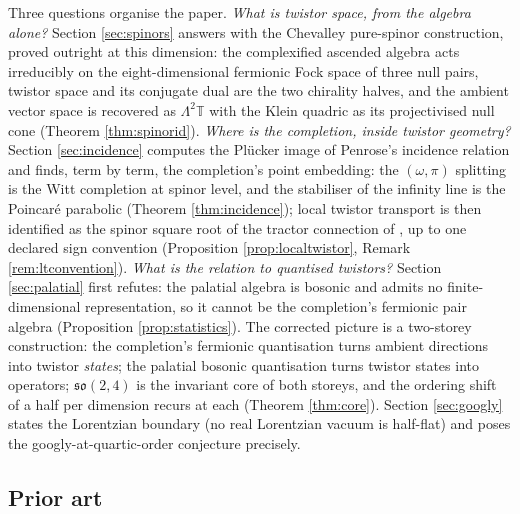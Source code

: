 \documentclass[11pt]{article}
\theoremstyle{definition}
\newcommand{\T}{\mathbb{T}}
\begin{document}
Three questions organise the paper. \emph{What is twistor space, from the algebra alone?} Section \ref{sec:spinors} answers with the Chevalley pure-spinor construction, proved outright at this dimension: the complexified ascended algebra acts irreducibly on the eight-dimensional fermionic Fock space of three null pairs, twistor space and its conjugate dual are the two chirality halves, and the ambient vector space is recovered as $\Lambda^2\T$ with the Klein quadric as its projectivised null cone (Theorem \ref{thm:spinorid}). \emph{Where is the completion, inside twistor geometry?} Section \ref{sec:incidence} computes the Pl\"ucker image of Penrose's incidence relation and finds, term by term, the completion's point embedding: the $(\omega,\pi)$ splitting is the Witt completion at spinor level, and the stabiliser of the infinity line is the Poincar\'e parabolic (Theorem \ref{thm:incidence}); local twistor transport is then identified as the spinor square root of the tractor connection of \cite{ButlerT6}, up to one declared sign convention (Proposition \ref{prop:localtwistor}, Remark \ref{rem:ltconvention}). \emph{What is the relation to quantised twistors?} Section \ref{sec:palatial} first refutes: the palatial algebra is bosonic and admits no finite-dimensional representation, so it cannot be the completion's fermionic pair algebra (Proposition \ref{prop:statistics}). The corrected picture is a two-storey construction: the completion's fermionic quantisation turns ambient directions into twistor \emph{states}; the palatial bosonic quantisation turns twistor states into operators; $\mathfrak{so}(2,4)$ is the invariant core of both storeys, and the ordering shift of a half per dimension recurs at each (Theorem \ref{thm:core}). Section \ref{sec:googly} states the Lorentzian boundary (no real Lorentzian vacuum is half-flat) and poses the googly-at-quartic-order conjecture precisely.

\subsection*{Prior art}
\end{document}
